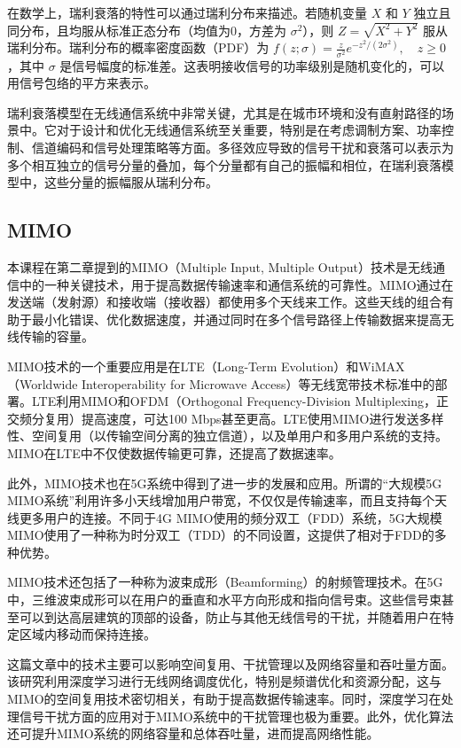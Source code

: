 \documentclass[UTF8, 12pt]{article}
\numberwithin{figure}{section}
\begin{document}
在数学上，瑞利衰落的特性可以通过瑞利分布来描述。若随机变量 \( X \) 和 \( Y \) 独立且同分布，且均服从标准正态分布（均值为0，方差为 \(\sigma^2\)），则 \( Z = \sqrt{X^2 + Y^2} \) 服从瑞利分布。瑞利分布的概率密度函数（PDF）为 \( f(z; \sigma) = \frac{z}{\sigma^2} e^{-z^2 / (2\sigma^2)}, \quad z \geq 0 \)，其中 \( \sigma \) 是信号幅度的标准差。这表明接收信号的功率级别是随机变化的，可以用信号包络的平方来表示。

瑞利衰落模型在无线通信系统中非常关键，尤其是在城市环境和没有直射路径的场景中。它对于设计和优化无线通信系统至关重要，特别是在考虑调制方案、功率控制、信道编码和信号处理策略等方面。多径效应导致的信号干扰和衰落可以表示为多个相互独立的信号分量的叠加，每个分量都有自己的振幅和相位，在瑞利衰落模型中，这些分量的振幅服从瑞利分布。

\subsection{MIMO}
本课程在第二章提到的MIMO（Multiple Input, Multiple Output）技术是无线通信中的一种关键技术，用于提高数据传输速率和通信系统的可靠性。MIMO通过在发送端（发射源）和接收端（接收器）都使用多个天线来工作。这些天线的组合有助于最小化错误、优化数据速度，并通过同时在多个信号路径上传输数据来提高无线传输的容量​​。

MIMO技术的一个重要应用是在LTE（Long-Term Evolution）和WiMAX（Worldwide Interoperability for Microwave Access）等无线宽带技术标准中的部署。LTE利用MIMO和OFDM（Orthogonal Frequency-Division Multiplexing，正交频分复用）提高速度，可达100 Mbps甚至更高。LTE使用MIMO进行发送多样性、空间复用（以传输空间分离的独立信道），以及单用户和多用户系统的支持。MIMO在LTE中不仅使数据传输更可靠，还提高了数据速率​​。

此外，MIMO技术也在5G系统中得到了进一步的发展和应用。所谓的“大规模5G MIMO系统”利用许多小天线增加用户带宽，不仅仅是传输速率，而且支持每个天线更多用户的连接。不同于4G MIMO使用的频分双工（FDD）系统，5G大规模MIMO使用了一种称为时分双工（TDD）的不同设置，这提供了相对于FDD的多种优势​​。

MIMO技术还包括了一种称为波束成形（Beamforming）的射频管理技术。在5G中，三维波束成形可以在用户的垂直和水平方向形成和指向信号束。这些信号束甚至可以到达高层建筑的顶部的设备，防止与其他无线信号的干扰，并随着用户在特定区域内移动而保持连接​​。

这篇文章中的技术主要可以影响空间复用、干扰管理以及网络容量和吞吐量方面。该研究利用深度学习进行无线网络调度优化，特别是频谱优化和资源分配，这与MIMO的空间复用技术密切相关，有助于提高数据传输速率。同时，深度学习在处理信号干扰方面的应用对于MIMO系统中的干扰管理也极为重要。此外，优化算法还可提升MIMO系统的网络容量和总体吞吐量，进而提高网络性能。
\clearpage
\end{document}

